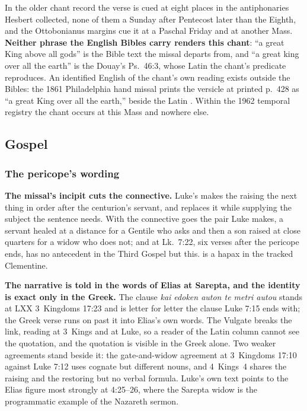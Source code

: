 In the older chant record the
verse is cued at eight places in the antiphonaries Hesbert
collected, none of them a Sunday after Pentecost later than the Eighth, and the
Ottobonianus margins cue it at a Paschal Friday and at another Mass.
\textbf{Neither phrase the English Bibles carry renders this chant}: ``a great
King above all gods'' is the Bible text the missal departs from, and ``a great
king over all the earth'' is the Douay's Ps.\ 46:3, whose Latin the chant's
predicate reproduces. An identified English of the chant's own reading exists
outside the Bibles: the 1861 Philadelphia hand missal prints the versicle at
printed p.~428 as ``a great King over all the earth,'' beside the Latin
. Within
the 1962 temporal registry the chant occurs at this Mass and nowhere else.

\subsection*{Gospel }

\subsubsection*{The pericope's wording}

\textbf{The missal's incipit cuts the connective.} Luke's  makes the raising the next thing in order after the centurion's
servant, and  replaces it while supplying the
subject the sentence needs. With the connective goes the pair Luke makes, a
servant healed at a distance for a Gentile who asks and then a son raised at close
quarters for a widow who does not; and  at
Lk.\ 7:22, six verses after the pericope ends, has no antecedent in the Third
Gospel but this.  is a hapax in the tracked Clementine.

\textbf{The narrative is told in the words of Elias at Sarepta, and the identity
is exact only in the Greek.} The clause \emph{kai edoken auton te metri autou}
stands at LXX 3~Kingdoms 17:23 and is letter for letter the clause Luke 7:15
ends with; the Greek verse runs on past it into Elias's own words. The Vulgate
breaks the link, reading  at 3~Kings and  at Luke, so a reader of the Latin column cannot see the
quotation, and the quotation is visible in the Greek alone. Two weaker agreements stand beside it: the gate-and-widow agreement at
3~Kingdoms 17:10 against Luke 7:12 uses cognate but different nouns, and
4~Kings~4 shares the raising and the restoring but no verbal formula. Luke's
own text points to the Elias figure most strongly at 4:25--26,
where the Sarepta widow is the programmatic example of the Nazareth sermon.

